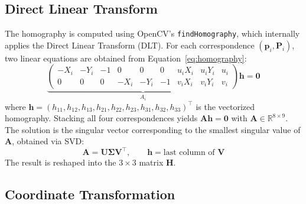 \documentclass[12pt]{report}
\begin{document}
\subsection{Direct Linear Transform}

The homography is computed using OpenCV's \texttt{findHomography}, which internally applies the Direct Linear Transform (DLT).
For each correspondence $(\mathbf{p}_i, \mathbf{P}_i)$, two linear equations are obtained from Equation~\eqref{eq:homography}:
\begin{equation}
    \underbrace{\begin{pmatrix}
    -X_i & -Y_i & -1 & 0 & 0 & 0 & u_i X_i & u_i Y_i & u_i \\
    0 & 0 & 0 & -X_i & -Y_i & -1 & v_i X_i & v_i Y_i & v_i
    \end{pmatrix}}_{A_i}
    \mathbf{h} = \mathbf{0}
    \label{eq:DLT}
\end{equation}
where $\mathbf{h} = (h_{11}, h_{12}, h_{13}, h_{21}, h_{22}, h_{23}, h_{31}, h_{32}, h_{33})^\top$ is the vectorized homography.
Stacking all four correspondences yields $\mathbf{A} \mathbf{h} = \mathbf{0}$ with $\mathbf{A} \in \mathbb{R}^{8 \times 9}$.
The solution is the singular vector corresponding to the smallest singular value of $\mathbf{A}$, obtained via SVD:
\begin{equation}
    \mathbf{A} = \mathbf{U} \boldsymbol{\Sigma} \mathbf{V}^\top, \qquad
    \mathbf{h} = \text{last column of } \mathbf{V}
    \label{eq:SVD}
\end{equation}
The result is reshaped into the $3 \times 3$ matrix $\mathbf{H}$.

\subsection{Coordinate Transformation}
\end{document}
